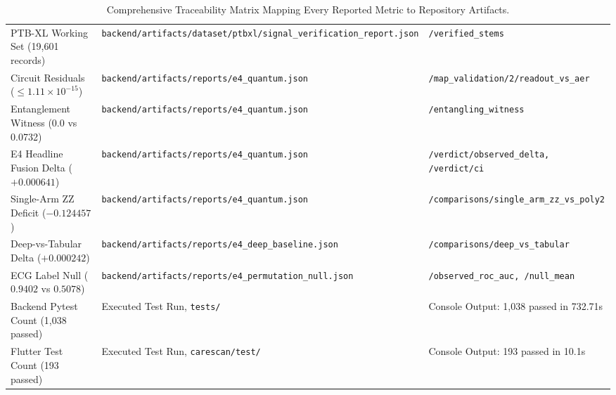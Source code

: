 \documentclass[11pt,a4paper]{report}
\newcommand{\artifact}[1]{\texttt{\footnotesize #1}}
\begin{document}
\begin{table}[H]
\begin{tabularx}{\textwidth}{llX}
PTB-XL Working Set (19,601 records) & \artifact{backend/artifacts/dataset/ptbxl/signal\_verification\_report.json} & \texttt{/verified\_stems} \\
Circuit Residuals ($\le 1.11 \times 10^{-15}$) & \artifact{backend/artifacts/reports/e4\_quantum.json} & \texttt{/map\_validation/2/readout\_vs\_aer} \\
Entanglement Witness (0.0 vs 0.0732) & \artifact{backend/artifacts/reports/e4\_quantum.json} & \texttt{/entangling\_witness} \\
E4 Headline Fusion Delta ($+0.000641$) & \artifact{backend/artifacts/reports/e4\_quantum.json} & \texttt{/verdict/observed\_delta, /verdict/ci} \\
Single-Arm ZZ Deficit ($-0.124457$) & \artifact{backend/artifacts/reports/e4\_quantum.json} & \texttt{/comparisons/single\_arm\_zz\_vs\_poly2} \\
Deep-vs-Tabular Delta ($+0.000242$) & \artifact{backend/artifacts/reports/e4\_deep\_baseline.json} & \texttt{/comparisons/deep\_vs\_tabular} \\
ECG Label Null ($0.9402$ vs $0.5078$) & \artifact{backend/artifacts/reports/e4\_permutation\_null.json} & \texttt{/observed\_roc\_auc, /null\_mean} \\
Backend Pytest Count (1,038 passed) & Executed Test Run, \artifact{tests/} & Console Output: 1,038 passed in 732.71s \\
Flutter Test Count (193 passed) & Executed Test Run, \artifact{carescan/test/} & Console Output: 193 passed in 10.1s \\
\bottomrule
\end{tabularx}
\caption{Comprehensive Traceability Matrix Mapping Every Reported Metric to Repository Artifacts.}
\label{tab:traceability_matrix}
\end{table}
\end{document}
